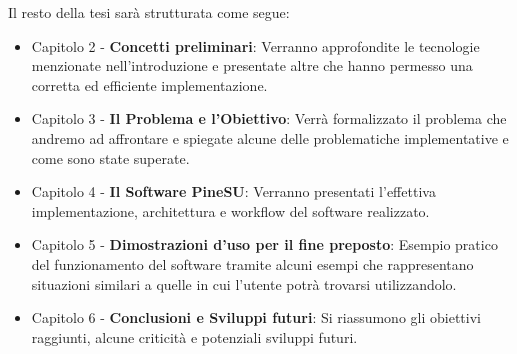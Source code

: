Il resto della tesi sarà strutturata come segue:
\begin{itemize}
    \item Capitolo 2 - \textbf{Concetti preliminari}: Verranno approfondite le tecnologie menzionate nell'introduzione e presentate altre che hanno permesso una corretta ed efficiente implementazione.
    \item Capitolo 3 - \textbf{Il Problema e l'Obiettivo}: Verrà formalizzato il problema che andremo ad affrontare e spiegate alcune delle problematiche implementative e come sono state superate.
    \item Capitolo 4 - \textbf{Il Software PineSU}: Verranno presentati l'effettiva implementazione, architettura e workflow del software realizzato.
    \item Capitolo 5 - \textbf{Dimostrazioni d'uso per il fine preposto}: Esempio pratico del funzionamento del software tramite alcuni esempi che rappresentano situazioni similari a quelle in cui l'utente potrà trovarsi utilizzandolo.
    \item Capitolo 6 - \textbf{Conclusioni e Sviluppi futuri}: Si riassumono gli obiettivi raggiunti, alcune criticità e potenziali sviluppi futuri.
\end{itemize}
